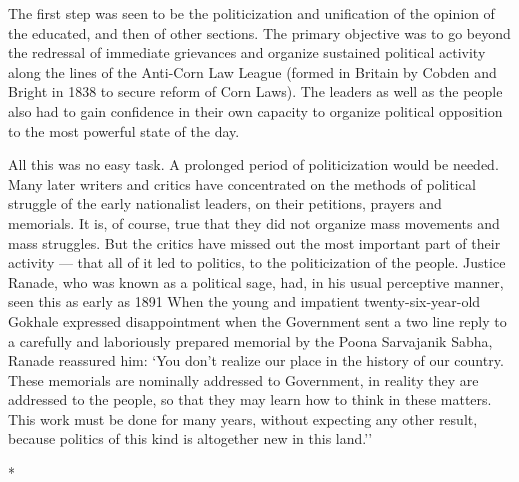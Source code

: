 The first step was seen to be the politicization and unification of the opinion of the educated, and then of other sections. The primary objective was to go beyond the redressal of immediate grievances and organize sustained political activity along the lines of the Anti-Corn Law League (formed in Britain by Cobden and Bright in 1838 to secure reform of Corn Laws). The leaders as well as the people also had to gain confidence in their own capacity to organize political opposition to the most powerful state of the day.

All this was no easy task. A prolonged period of politicization would be needed. Many later writers and critics have concentrated on the methods of political struggle of the early nationalist leaders, on their petitions, prayers and memorials. It is, of course, true that they did not organize mass movements and mass struggles. But the critics have missed out the most important part of their activity --- that all of it led to politics, to the politicization of the people. Justice Ranade, who was known as a political sage, had, in his usual perceptive manner, seen this as early as 1891 When the young and impatient twenty-six-year-old Gokhale expressed disappointment when the Government sent a two line reply to a carefully and laboriously prepared memorial by the Poona Sarvajanik Sabha, Ranade reassured him: `You don't realize our place in the history of our country. These memorials are nominally addressed to Government, in reality they are addressed to the people, so that they may learn how to think in these matters. This work must be done for many years, without expecting any other result, because politics of this kind is altogether new in this land.''

\begin{center}*\end{center}

\paragraph*{}

